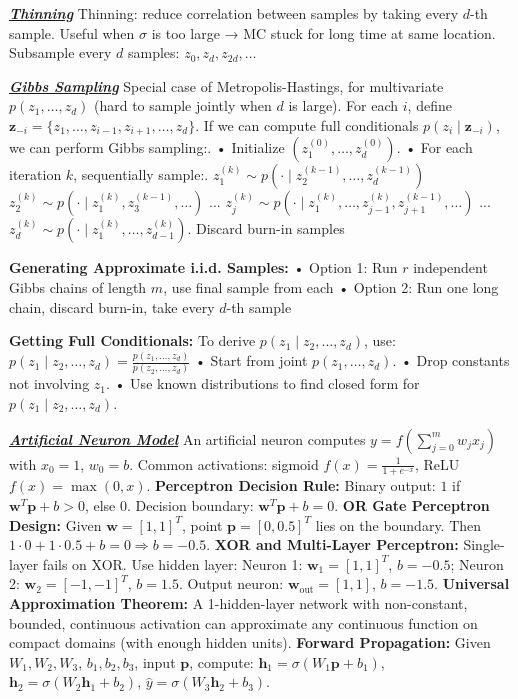 \documentclass[10pt]{article}
\newcommand{\bulletPoint}[1]{\ul{\textit{\textbf{#1}}}}
\begin{document}
\begin{multicols*}{2}
\bulletPoint{Thinning}\quad
Thinning: reduce correlation between samples by taking every $d$-th sample. 
Useful when $\sigma$ is too large → MC stuck for long time at same location. 
Subsample every $d$ samples: $z_0, z_d, z_{2d}, \dots$



\bulletPoint{Gibbs Sampling}\quad
Special case of Metropolis-Hastings, for multivariate $p(z_1, \dots, z_d)$ (hard to sample jointly when $d$ is large). 
For each $i$, define $\mathbf{z}_{-i} = \{z_1,\dots,z_{i-1},z_{i+1},\dots,z_d\}$. 
If we can compute full conditionals $p(z_i \mid \mathbf{z}_{-i})$, we can perform Gibbs sampling:. 
• Initialize $(z_1^{(0)}, \dots, z_d^{(0)})$.   
• For each iteration $k$, sequentially sample:. 
$z_1^{(k)} \sim p(\cdot \mid z_2^{(k-1)}, \dots, z_d^{(k-1)})$  
$z_2^{(k)} \sim p(\cdot \mid z_1^{(k)}, z_3^{(k-1)}, \dots)$  
...  
$z_j^{(k)} \sim p(\cdot \mid z_1^{(k)}, \dots, z_{j-1}^{(k)}, z_{j+1}^{(k-1)}, \dots)$  
...
$z_d^{(k)} \sim p(\cdot \mid z_1^{(k)}, \dots, z_{d-1}^{(k)})$. 
Discard burn-in samples

\textbf{Generating Approximate i.i.d. Samples:} 
• Option 1: Run $r$ independent Gibbs chains of length $m$, use final sample from each  
• Option 2: Run one long chain, discard burn-in, take every $d$-th sample

\textbf{Getting Full Conditionals:}
To derive $p(z_1 \mid z_2, \dots, z_d)$, use: 
$p(z_1 \mid z_2, \dots, z_d) = \frac{p(z_1, \dots, z_d)}{p(z_2, \dots, z_d)}$
• Start from joint $p(z_1, \dots, z_d)$.   
• Drop constants not involving $z_1$.   
• Use known distributions to find closed form for $p(z_1 \mid z_2, \dots, z_d)$. 


\bulletPoint{Artificial Neuron Model} \quad
An artificial neuron computes $y = f\left(\sum_{j=0}^{m} w_j x_j\right)$ with $x_0 = 1$, $w_0 = b$. \quad
Common activations: sigmoid $f(x) = \frac{1}{1 + e^{-x}}$, ReLU $f(x) = \max(0, x)$. \quad
\textbf{Perceptron Decision Rule:} 
Binary output: $1$ if $\mathbf{w}^T \mathbf{p} + b > 0$, else $0$. \quad
Decision boundary: $\mathbf{w}^T \mathbf{p} + b = 0$. \quad
\textbf{OR Gate Perceptron Design:} 
Given $\mathbf{w} = [1, 1]^T$, point $\mathbf{p} = [0, 0.5]^T$ lies on the boundary. \quad
Then $1 \cdot 0 + 1 \cdot 0.5 + b = 0 \Rightarrow b = -0.5$. \quad
\textbf{XOR and Multi-Layer Perceptron:} 
Single-layer fails on XOR. Use hidden layer: \quad
Neuron 1: $\mathbf{w}_1 = [1,1]^T$, $b = -0.5$; Neuron 2: $\mathbf{w}_2 = [-1,-1]^T$, $b = 1.5$. \quad
Output neuron: $\mathbf{w}_{\text{out}} = [1,1]$, $b = -1.5$. \quad
\textbf{Universal Approximation Theorem:} 
A 1-hidden-layer network with non-constant, bounded, continuous activation can approximate any continuous function on compact domains (with enough hidden units). \quad
\textbf{Forward Propagation:} \quad
Given $W_1, W_2, W_3$, $b_1, b_2, b_3$, input $\mathbf{p}$, compute: \quad
$\mathbf{h}_1 = \sigma(W_1 \mathbf{p} + b_1)$, $\mathbf{h}_2 = \sigma(W_2 \mathbf{h}_1 + b_2)$, $\hat{y} = \sigma(W_3 \mathbf{h}_2 + b_3)$.




\end{multicols*}
\end{document}
